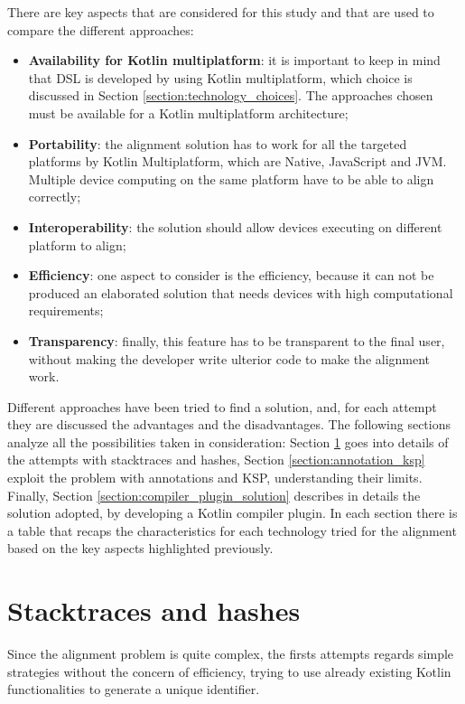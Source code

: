 There are key aspects that are considered for this study and that are used to compare the different approaches:
\begin{itemize}
    \item \textbf{Availability for Kotlin multiplatform}: it is important to keep in mind that DSL is developed by using Kotlin multiplatform, which choice is discussed in Section \ref{section:technology_choices}. The approaches chosen must be available for a Kotlin multiplatform architecture;
    \item \textbf{Portability}: the alignment solution has to work for all the targeted platforms by Kotlin Multiplatform, which are Native, JavaScript and JVM. Multiple device computing on the same platform have to be able to align correctly;
    \item \textbf{Interoperability}: the solution should allow devices executing on different platform to align;
    \item \textbf{Efficiency}: one aspect to consider is the efficiency, because it can not be produced an elaborated solution that needs devices with high computational requirements;
    \item \textbf{Transparency}: finally, this feature has to be transparent to the final user, without making the developer write ulterior code to make the alignment work.
\end{itemize}

Different approaches have been tried to find a solution, and, for each attempt they are discussed the advantages and the disadvantages. The following sections analyze all the possibilities taken in consideration: Section \ref{section:stacktraces_hashes} goes into details of the attempts with stacktraces and hashes, Section \ref{section:annotation_ksp} exploit the problem with annotations and KSP, understanding their limits. Finally, Section \ref{section:compiler_plugin_solution} describes in details the solution adopted, by developing a Kotlin compiler plugin. In each section there is a table that recaps the characteristics for each technology tried for the alignment based on the key aspects highlighted previously.

\section{Stacktraces and hashes}\label{section:stacktraces_hashes}
Since the alignment problem is quite complex, the firsts attempts regards simple strategies without the concern of efficiency, trying to use already existing Kotlin functionalities to generate a unique identifier.

